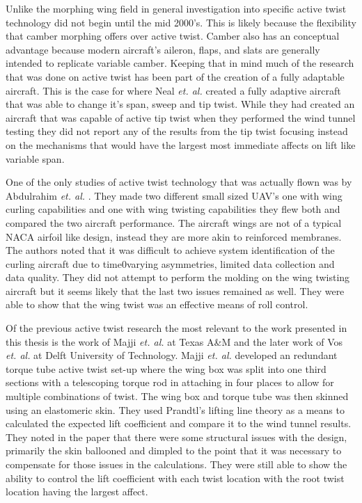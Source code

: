 \documentclass[11pt]{ucthesis}
\begin{document}
Unlike the morphing wing field in general investigation into specific active twist technology did not begin until the mid 2000's. This is likely because the flexibility that camber morphing offers over active twist. Camber also has an conceptual advantage because modern aircraft's aileron, flaps, and slats are generally intended to replicate variable camber. Keeping that in mind much of the research that was done on active twist has been part of the creation of a fully adaptable aircraft. This is the case for \cite{neal2004design} where Neal \textit{et. al.} created a fully adaptive aircraft that was able to change it's span, sweep and tip twist. While they had created an aircraft that was capable of active tip twist when they performed the wind tunnel testing they did not report any of the results from the tip twist focusing instead on the mechanisms that would have the largest most immediate affects on lift like variable span.

One of the only studies of active twist technology that was actually flown was by Abdulrahim \textit{et. al.} \cite{abdulrahim2004flight}. They made two different small sized UAV's one with wing curling capabilities and one with wing twisting capabilities they flew both and compared the two aircraft performance. The aircraft wings are not of a typical NACA airfoil like design, instead they are more akin to reinforced membranes. The authors noted that it was difficult to achieve system identification of the curling aircraft due to time0varying asymmetries, limited data collection and data quality. They did not attempt to perform the molding on the wing twisting aircraft but it seems likely that the last two issues remained as well. They were able to show that the wing twist was an effective means of roll control.

Of the previous active twist research the most relevant to the work presented in this thesis is the work of Majji \textit{et. al.}\cite{majji2007design} at Texas A\&M and the later work of Vos \textit{et. al.}\cite{vos2010mechanism} at Delft University of Technology. Majji \textit{et. al.} developed an redundant torque tube active twist set-up where the wing box was split into one third sections with a telescoping torque rod in attaching in four places to allow for multiple combinations of twist. The wing box and torque tube was then skinned using an elastomeric skin. They used Prandtl's lifting line theory as a means to calculated the expected lift coefficient and compare it to the wind tunnel results. They noted in the paper that there were some structural issues with the design, primarily the skin ballooned and dimpled to the point that it was necessary to compensate for those issues in the calculations. They were still able to show the ability to control the lift coefficient with each twist location with the root twist location having the largest affect.
\end{document}
